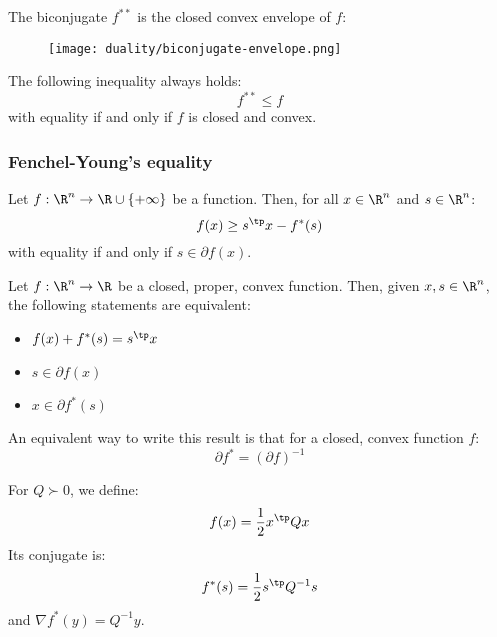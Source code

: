 \begin{property}
    The biconjugate $f^{**}$ is the closed convex envelope of $f$:
    \begin{figure}[H]
        \centering
        \texttt{[image: duality/biconjugate-envelope.png]}
    \end{figure}
\end{property}
\begin{property}
    The following inequality always holds:
    \begin{equation*}
        f^{**}\leq f
    \end{equation*}
    with equality if and only if $f$ is closed and convex.
\end{property}

\subsubsection{Fenchel-Young's equality}
\begin{theorem}
    Let $f:\R^n\to\R\cup\{+\infty\}$ be a function. Then, for all $x\in\R^n$ and $s\in\R^n$:
    \begin{equation}
        \label{eq:fenchel-young-in}
        f(x) \geq s^\tp x - f^*(s)
    \end{equation}
    with equality if and only if $s\in\partial f(x)$.
\end{theorem}

\begin{theorem}
    Let $f:\R^n\to\R$ be a closed, proper, convex function. Then, given $x, s\in\R^n$, the following statements are equivalent:
    \begin{itemize}
        \item $f(x)+f^*(s)=s^\tp x$
        \item $s\in\partial f(x)$
        \item $x\in\partial f^*(s)$
    \end{itemize}
    An equivalent way to write this result is that for a closed, convex function $f$:
    \begin{equation}
        \partial f^* = (\partial f)^{-1}
    \end{equation}
\end{theorem}

\begin{example}
    For $Q\succ 0$, we define:
    \begin{equation*}
        f(x) = \frac{1}{2}x^\tp Qx
    \end{equation*}
    Its conjugate is:
    \begin{equation*}
        f^*(s) = \frac{1}{2}s^\tp Q^{-1}s
    \end{equation*}
    and $\nabla f^*(y) = Q^{-1}y$.
\end{example}

